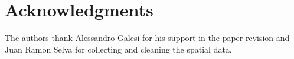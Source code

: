 \documentclass[times,final]{elsarticle}
\begin{document}
%

%
%

\section*{Acknowledgments}

The authors thank Alessandro Galesi for his support in the paper revision and Juan Ramon Selva for collecting and cleaning the spatial data.

\end{document}
